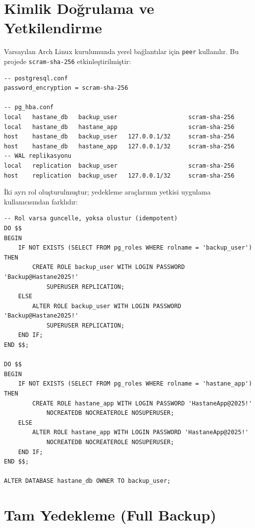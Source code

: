 \documentclass[12pt, a4paper]{report}
\begin{document}
\section{Kimlik Doğrulama ve Yetkilendirme}

Varsayılan Arch Linux kurulumunda yerel bağlantılar için \texttt{peer} kullanılır. Bu projede \texttt{scram-sha-256} etkinleştirilmiştir:

\begin{lstlisting}[caption={pg\_hba\_example.conf — şifre doğrulama}]
-- postgresql.conf
password_encryption = scram-sha-256

-- pg_hba.conf
local   hastane_db   backup_user                    scram-sha-256
local   hastane_db   hastane_app                    scram-sha-256
host    hastane_db   backup_user   127.0.0.1/32     scram-sha-256
host    hastane_db   hastane_app   127.0.0.1/32     scram-sha-256
-- WAL replikasyonu
local   replication  backup_user                    scram-sha-256
host    replication  backup_user   127.0.0.1/32     scram-sha-256
\end{lstlisting}

\newpage
İki ayrı rol oluşturulmuştur; yedekleme araçlarının yetkisi uygulama kullanıcısından farklıdır:

\begin{lstlisting}[caption={03\_rol\_ekle.sql — roller}]
-- Rol varsa guncelle, yoksa olustur (idempotent)
DO $$
BEGIN
    IF NOT EXISTS (SELECT FROM pg_roles WHERE rolname = 'backup_user') THEN
        CREATE ROLE backup_user WITH LOGIN PASSWORD 'Backup@Hastane2025!'
            SUPERUSER REPLICATION;
    ELSE
        ALTER ROLE backup_user WITH LOGIN PASSWORD 'Backup@Hastane2025!'
            SUPERUSER REPLICATION;
    END IF;
END $$;

DO $$
BEGIN
    IF NOT EXISTS (SELECT FROM pg_roles WHERE rolname = 'hastane_app') THEN
        CREATE ROLE hastane_app WITH LOGIN PASSWORD 'HastaneApp@2025!'
            NOCREATEDB NOCREATEROLE NOSUPERUSER;
    ELSE
        ALTER ROLE hastane_app WITH LOGIN PASSWORD 'HastaneApp@2025!'
            NOCREATEDB NOCREATEROLE NOSUPERUSER;
    END IF;
END $$;

ALTER DATABASE hastane_db OWNER TO backup_user;
\end{lstlisting}

\newpage
\section{Tam Yedekleme (Full Backup)}
\end{document}
